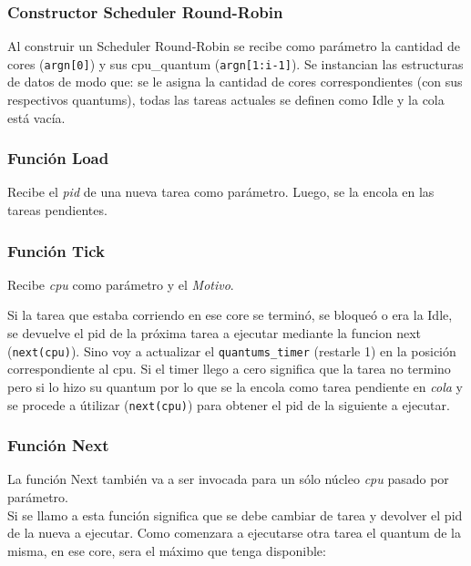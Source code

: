 \documentclass[a4paper]{article}
\begin{document}
	
				
\subsubsection*{Constructor Scheduler Round-Robin}	

Al construir un Scheduler Round-Robin se recibe como parámetro la cantidad de cores (\texttt{argn[0]}) y sus cpu\_quantum (\texttt{argn[1:i-1]}). Se instancian las estructuras de datos de modo que: se le asigna la cantidad de cores correspondientes (con sus respectivos quantums), todas las tareas actuales se definen como Idle y la cola est\'a vac\'ia.


\subsubsection*{Funci\'on Load}

Recibe el \emph{pid} de una nueva tarea como par\'ametro. Luego, se la encola en las tareas pendientes.

\subsubsection*{Funci\'on Tick}	

Recibe \emph{cpu} como par\'ametro y el \emph{Motivo}. 

Si la tarea que estaba corriendo en ese core se terminó, se bloqueó o era la Idle, se devuelve el pid de la próxima tarea a ejecutar mediante la funcion next (\texttt{next(cpu)}).
Sino voy a actualizar el \texttt{quantums\_timer} (restarle 1) en la posición correspondiente al cpu. Si el timer llego a cero significa que la tarea no termino 
pero si lo hizo su quantum por lo que se la encola como tarea pendiente en \emph{cola} y se procede a útilizar (\texttt{next(cpu)}) para obtener el pid de la siguiente a ejecutar.


\subsubsection*{Funci\'on Next}	
	
	
La funci\'on Next tambi\'en va a ser invocada para un s\'olo n\'ucleo \emph{cpu} pasado por par\'ametro.\\
Si se llamo a esta función significa que se debe cambiar de tarea y devolver el pid de la nueva a ejecutar. Como comenzara a ejecutarse otra tarea el quantum de la misma, en ese core, sera el máximo que tenga disponible:
\end{document}
